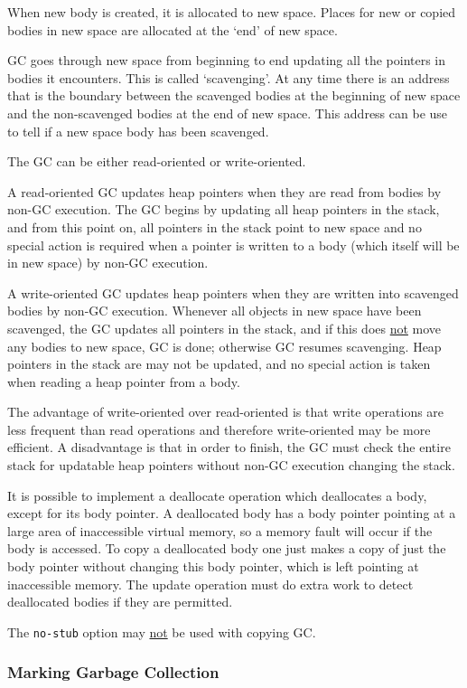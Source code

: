 \documentclass[12pt]{article}
\begin{document}
When new body is created, it is allocated to new space.
Places for new or copied bodies in new space are
allocated at the `end' of new space.

GC goes through new space from beginning to end updating
all the pointers in bodies it encounters.  This is called
`scavenging'.  At any time there is an address that is the
boundary between the scavenged bodies at the beginning
of new space and the non-scavenged bodies at the end of
new space.  This address can be use to tell if a new space
body has been scavenged.

The GC can be either read-oriented or write-oriented.

A read-oriented GC updates heap pointers when they are read
from bodies by non-GC execution.
The GC begins by updating all heap pointers in the
stack, and from this point on, all pointers in the stack
point to new space and no special action is required when
a pointer is written to a body (which itself will be in new
space) by non-GC execution.

A write-oriented GC updates heap pointers when they are
written into scavenged bodies by non-GC execution. 
Whenever all objects in new space have been scavenged,
the GC updates all pointers in the stack, and if this does \underline{not}
move any bodies to new space, GC is done; otherwise
GC resumes scavenging.  Heap pointers in the stack are
may not be updated, and no special action is taken
when reading a heap pointer from a body.

The advantage of write-oriented over read-oriented is
that write operations are less frequent than read
operations and therefore write-oriented may be more
efficient.  A disadvantage is that in order to finish, the GC
must check the entire stack for updatable heap pointers
without non-GC execution changing the stack.

It is possible to implement a deallocate operation
which deallocates a body, except for its body pointer.
A deallocated body has a body pointer pointing at
a large area of inaccessible virtual memory, so a
memory fault will occur if the body is accessed.
To copy a deallocated body one just makes a copy
of just the body pointer without changing this body pointer,
which is left pointing at inaccessible memory.
The update operation must do extra work to detect
deallocated bodies if they are permitted.

The {\tt no-stub} option may \underline{not} be used with
copying GC.

\subsubsection{Marking Garbage Collection}
\end{document}
